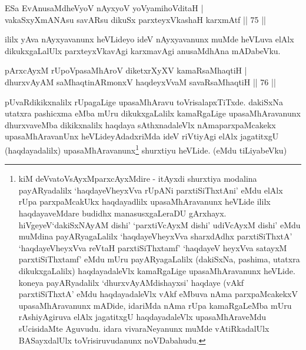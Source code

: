 
\begin{shl}
ESa EvAnusaMdheVyoV nAyxyoV yoV\s yamihoVditaH |\\
vakaSxyXmANAsu savARsu dikuSx parxteyxVkashaH karxmAtf \hfill || 75 ||
\end{shl}

\begin{artha}
ililx yAva nAyxyavanunx heVLideyo ideV nAyxyavanunx muMde heVLuva elAlx dikukxgaLalUlx parxteyxVkavAgi karxmavAgi anusaMdhAna mADabeVku.
\end{artha}


\begin{shl}
pArxcAyxM rUpoVpasaMhAroV diketxrXyXV kamaRsaMhaqtiH |\\
dhurxvAyAM saMhaqtinARmonxV haqdeyxVvaM savaRsaMhaqtiH \hfill || 76 ||
\end{shl}

\begin{artha}
pUvaRdikikxnalilx rUpagaLige upasaMhAravu toVrisalapxTiTxde. dakiSxNa utatxra pashicxma eMba mUru dikukxgaLalilx kamaRgaLige upasaMhAravanunx dhurxvaveMba dikikxnalilx haqdaya sAthxnadaleVlx nAmaparxpaMcakekx upasaMhAravanUnx heVLideyAdadxriMda ideV riVtiyAgi elAlx jagatitxgU (haqdayadalilx) upasaMhAravanunx\footnote[1]{kiM deVvatoV\s sAyxMparxcAyxMdire - itAyxdi shurxtiya modalina payARyadalilx `haqdayeVheyxVva rUpANi parxtiSiThxtAni' eMdu elAlx rUpa parxpaMcakUkx haqdayadlilx upasaMhAravanunx heVLide ililx haqdayaveMdare budidhx manasusxgaLeraDU gArxhayx. hiVgeyeV`dakiSxNAyAM dishi' `parxtiVcAyxM dishi' udiVcAyxM dishi' eMdu muMdina payARyagaLalilx `haqdayeVheyxVva sharxdAdhx parxtiSiThxtA' `haqdayeVheyxVva reVtaH parxtiSiThxtamf' `haqdayeV heyxVva satayxM parxtiSiThxtamf' eMdu mUru payARyagaLalilx (dakiSxNa, pashima, utatxra dikukxgaLalilx) haqdayadaleVlx kamaRgaLige upasaMhAravanunx heVLide. koneya payARyadalilx `dhurxvAyAMdishayxsi' haqdaye (vAkf parxtiSiThxtA' eMdu haqdayadaleVlx vAkf eMbuva nAma parxpaMcakekxV upasaMhAravanunx mADide, idariMda nAma rUpa kamaRgaLeMba mUru rAshiyAgiruva elAlx jagatitxgU haqdayadaleVlx upasaMhAraveMdu sUcisidaMte Aguvudu. idara vivaraNeyanunx muMde vAtiRkadalUlx BASayxdalUlx toVrisiruvudanunx noVDabahudu.} shurxtiyu heVLide. (eMdu tiLiyabeVku)
\end{artha}

